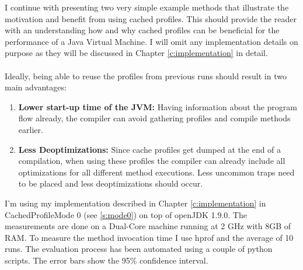 I continue with presenting two very simple example methods that illustrate the motivation and benefit from using cached profiles.
This should provide the reader with an understanding how and why cached profiles can be beneficial for the performance of a Java Virtual Machine.
I will omit any implementation details on purpose as they will be discussed in Chapter \ref{c:implementation} in detail.
\\\\
Ideally, being able to reuse the profiles from previous runs should result in two main advantages:
\begin{enumerate}
  \item \textbf{Lower start-up time of the JVM:} Having information about the program flow already, the compiler can avoid gathering profiles and compile methods earlier.
  \item \textbf{Less Deoptimizations:} Since cache profiles get dumped at the end of a compilation, when using these profiles the compiler can already include all optimizations for all different method executions. Less uncommon traps need to be placed and less deoptimizations should occur.
\end{enumerate}
I'm using my implementation described in Chapter \ref{c:implementation} in CachedProfileMode 0 (see \ref{s:mode0}) on top of openJDK 1.9.0.
The measurements are done on a Dual-Core machine running at 2 GHz with 8GB of RAM. To measure the method invocation time I use hprof \cite{hprof} and the average of 10 runs. The evaluation process has been automated using a couple of python scripts. The error bars show the 95\% confidence interval.
